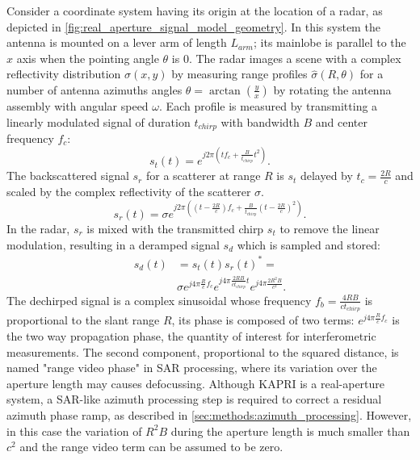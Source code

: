 Consider a coordinate system having its origin at the location of a radar, as depicted in \autoref{fig:real_aperture_signal_model_geometry}. In this system the antenna is mounted on a lever arm of length $L_{arm}$; its mainlobe is parallel to the $x$ axis when the pointing angle $\theta$ is 0. The radar images a scene with a complex reflectivity distribution $\sigma\left(x,y\right)$ by measuring range profiles $\hat{\sigma}\left(R, \theta\right)$ for a number of antenna azimuths angles $\theta = \operatorname{arctan}\left(\frac{y}{x}\right)$ by rotating the antenna assembly with angular speed $\omega$. Each profile is measured by transmitting a linearly modulated signal of duration $t_{chirp}$ with bandwidth $B$ and center frequency $f_c$:
\begin{equation}
	s_t\left(t\right) = e^{j 2 \pi \left( t f_{c} +  \frac{B}{t_{chirp}} t^2 \right)}.
\end{equation}
The backscattered signal $s_r$ for a scatterer at range $R$ is $s_t$ delayed by $t_{c} = \frac{2 R}{c}$ and scaled by the complex reflectivity of the scatterer $\sigma$.
\begin{equation}
		s_r\left(t\right) = \sigma e^{j 2 \pi \left( \left(t - \frac{2 R}{c}\right) f_{c} +  \frac{B}{t_{chirp}} \left(t - \frac{2 R}{c}\right)^2 \right)}.
\end{equation}
In the radar, $s_r$ is mixed with the transmitted chirp $s_t$  to remove the linear modulation, resulting in a deramped signal $s_d$ which is sampled and stored: 
\begin{equation}\label{eq:deramp}
	\begin{aligned}
	s_{d}\left(t\right) &=s_t\left(t\right)s_r\left(t\right)^* =\\ 
	&\sigma e^{j 4 \pi \frac{ R}{c}f_c}  e^{j 4 \pi \frac{2 R B }{c t_{chirp}} t}  e^{j 4 \pi \frac{2 R^2 B}{c^2}}.
	\end{aligned}
\end{equation} 
The dechirped signal is a complex sinusoidal whose frequency $f_{b} = \frac{4 R B}{c t_{chirp}}$ is proportional to the slant range $R$, its phase is composed of two terms: $ e^{j 4 \pi \frac{R}{c}f_c}$ is the two way propagation phase, the quantity of interest for  interferometric measurements. The second component, proportional to the squared distance, is named "range video phase" in SAR processing, where its variation over the aperture length may causes defocussing. Although KAPRI is a real-aperture system, a SAR-like azimuth processing step is required to correct a residual azimuth phase ramp, as described in \autoref{sec:methods:azimuth_processing}. However, in this case the variation of $R^2B$ during the aperture length is much smaller than $c^2$ and the range video term can be assumed to be zero.\\

